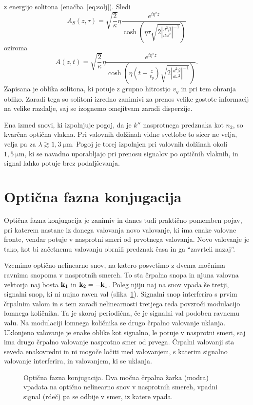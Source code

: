 z energijo solitona (enačba~\ref{eq:solj}). Sledi 
\begin{equation}
A_S\left(z,\tau\right)=\sqrt{\frac{2}{\kappa}}\eta\frac{e^{i\eta^{2}z}}{{\cosh}\left(\eta \tau 
\sqrt{2\left|\frac{d^{2}\beta}{d\omega^{2}}\right|^{-1}}\right)}
\end{equation}
oziroma
\begin{equation}
A\left(z,t\right)=\sqrt{\frac{2}{\kappa}}\eta\frac{e^{i\eta^{2}z}}{{\cosh}\left(\eta (t-\frac{z}{v_g}) 
\sqrt{2\left|\frac{d^{2}\beta}{d\omega^{2}}\right|^{-1}}\right)}.
\label{8.96}
\end{equation}
Zapisana je oblika solitona, ki potuje z grupno hitrostjo $v_g$ in pri tem ohranja obliko. Zaradi tega
so solitoni izredno zanimivi za prenos velike gostote informacij na velike razdalje, saj se izognemo
omejitvam zaradi disperzije. 

\begin{remark}
Ena izmed snovi, ki izpolnjuje pogoj, da je $k''$ nasprotnega predznaka kot $n_2$, so kvarčna 
optična vlakna. Pri valovnih dolžinah vidne svetlobe to sicer ne velja, velja pa za 
$\lambda \gtrsim 1,3~\si{\micro\metre}$.
Pogoj je torej izpolnjen pri valovnih dolžinah okoli $1,5~\si{\micro\metre}$, ki se navadno uporabljajo 
pri prenosu signalov po optičnih vlaknih, in signal lahko potuje brez podaljševanja. 
\end{remark}

\section{Optična fazna konjugacija}
Optična fazna konjugacija je zanimiv in danes tudi praktično pomemben
pojav, pri katerem nastane iz danega valovanja novo valovanje, ki ima enake valovne
fronte, vendar potuje v nasprotni smeri od prvotnega valovanja. Novo valovanje je tako,
kot bi začetnemu valovanju obrnili predznak časa in ga ``zavrteli nazaj''.

Vzemimo optično nelinearno snov, na katero posvetimo z dvema močnima ravnima
snopoma v nasprotnih smereh. To sta črpalna snopa in njuna valovna vektorja 
naj bosta ${\bf k}_{1}$ in ${\bf k}_2 = -{\bf k}_{1}$. Poleg njiju naj na snov vpada
še tretji, signalni snop, ki ni nujno raven val (slika~\ref{08_OPC1}). 
Signalni snop interferira s prvim črpalnim valom in s tem zaradi nelinearnosti 
tretjega reda povzroči modulacijo lomnega količnika. Ta je skoraj periodična, če
je signalni val podoben ravnemu valu. Na modulaciji lomnega količnika se
drugo črpalno valovanje uklanja. Uklonjeno valovanje je enake oblike
kot signalno, le potuje v nasprotni smeri, saj ima drugo črpalno valovanje
nasprotno smer od prvega. Črpalni valovanji sta seveda enakovredni in ni
mogoče ločiti med valovanjem, s katerim signalno valovanje interferira, in valovanjem, 
ki se uklanja.
\begin{figure}[h]
\centering
\def\svgwidth{60truemm} 

\caption{Optična fazna konjugacija. Dva močna črpalna žarka (modra) vpadata 
na optično nelinearno snov v nasprotnih smereh, vpadni signal (rdeč) pa se odbije v 
smer, iz katere vpada.}
\label{08_OPC1}
\end{figure}


